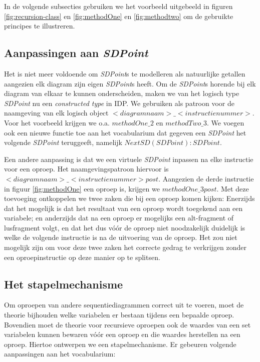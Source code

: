 In de volgende subsecties gebruiken we het voorbeeld uitgebeeld in figuren \ref{fig:recursion-class} en \ref{fig:methodOne} en \ref{fig:methodtwo} om de gebruikte principes te illustreren.

\subsection{Aanpassingen aan \textit{SDPoint}}
Het is niet meer voldoende om \textit{SDPoint}s te modelleren als natuurlijke getallen aangezien elk diagram zijn eigen \textit{SDPoint}s heeft. Om de \textit{SDPoint}s horende bij elk diagram van elkaar te kunnen onderscheiden, maken we van het logisch type \textit{SDPoint} nu een \textit{constructed type} in IDP. We gebruiken als patroon voor de naamgeving van elk logisch object $<diagramnaam>\_<instructienummer>$. Voor het voorbeeld krijgen we o.a. $methodOne\_2$ en $methodTwo\_3$. We voegen ook een nieuwe functie toe aan het vocabularium dat gegeven een \textit{SDPoint} het volgende \textit{SDPoint} teruggeeft, namelijk $NextSD(SDPoint) : SDPoint$.

Een andere aanpassing is dat we een virtuele \textit{SDPoint} inpassen na elke instructie voor een oproep. Het naamgevingspatroon hiervoor is $<diagramnaam>\_<instructienummer>post$. Aangezien de derde instructie in figuur \ref{fig:methodOne} een oproep is, krijgen we $methodOne\_3post$. Met deze toevoeging ontkoppelen we twee zaken die bij een oproep komen kijken: Enerzijds dat het mogelijk is dat het resultaat van een oproep wordt toegekend aan een variabele; en anderzijds dat na een oproep er mogelijks een alt-fragment of lusfragment volgt, en dat het dus v\'o\'or de oproep niet noodzakelijk duidelijk is welke de volgende instructie is na de uitvoering van de oproep. Het zou niet mogelijk zijn om voor deze twee zaken het correcte gedrag te verkrijgen zonder een oproepinstructie op deze manier op te splitsen.

\subsection{Het stapelmechanisme}
Om oproepen van andere sequentiediagrammen correct uit te voeren, moet de theorie bijhouden welke variabelen er bestaan tijdens een bepaalde oproep. Bovendien moet de theorie voor recursieve oproepen ook de waardes van een set variabelen kunnen bewaren v\'o\'or een oproep en die waardes herstellen na een oproep. Hiertoe ontwerpen we een stapelmechanisme. Er gebeuren volgende aanpassingen aan het vocabularium:

